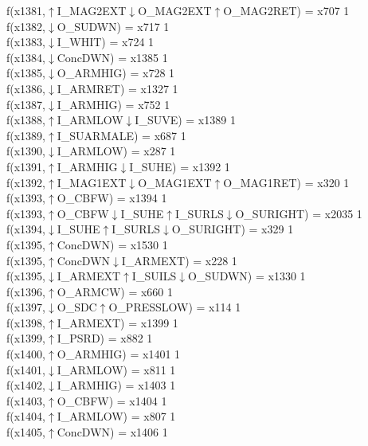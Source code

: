 f(x1381,$\uparrow$I\_MAG2EXT$\downarrow$O\_MAG2EXT$\uparrow$O\_MAG2RET) = x707 {1} \\
f(x1382,$\downarrow$O\_SUDWN) = x717 {1} \\
f(x1383,$\downarrow$I\_WHIT) = x724 {1} \\
f(x1384,$\downarrow$ConcDWN) = x1385 {1} \\
f(x1385,$\downarrow$O\_ARMHIG) = x728 {1} \\
f(x1386,$\downarrow$I\_ARMRET) = x1327 {1} \\
f(x1387,$\downarrow$I\_ARMHIG) = x752 {1} \\
f(x1388,$\uparrow$I\_ARMLOW$\downarrow$I\_SUVE) = x1389 {1} \\
f(x1389,$\uparrow$I\_SUARMALE) = x687 {1} \\
f(x1390,$\downarrow$I\_ARMLOW) = x287 {1} \\
f(x1391,$\uparrow$I\_ARMHIG$\downarrow$I\_SUHE) = x1392 {1} \\
f(x1392,$\uparrow$I\_MAG1EXT$\downarrow$O\_MAG1EXT$\uparrow$O\_MAG1RET) = x320 {1} \\
f(x1393,$\uparrow$O\_CBFW) = x1394 {1} \\
f(x1393,$\uparrow$O\_CBFW$\downarrow$I\_SUHE$\uparrow$I\_SURLS$\downarrow$O\_SURIGHT) = x2035 {1} \\
f(x1394,$\downarrow$I\_SUHE$\uparrow$I\_SURLS$\downarrow$O\_SURIGHT) = x329 {1} \\
f(x1395,$\uparrow$ConcDWN) = x1530 {1} \\
f(x1395,$\uparrow$ConcDWN$\downarrow$I\_ARMEXT) = x228 {1} \\
f(x1395,$\downarrow$I\_ARMEXT$\uparrow$I\_SUILS$\downarrow$O\_SUDWN) = x1330 {1} \\
f(x1396,$\uparrow$O\_ARMCW) = x660 {1} \\
f(x1397,$\downarrow$O\_SDC$\uparrow$O\_PRESSLOW) = x114 {1} \\
f(x1398,$\uparrow$I\_ARMEXT) = x1399 {1} \\
f(x1399,$\uparrow$I\_PSRD) = x882 {1} \\
f(x1400,$\uparrow$O\_ARMHIG) = x1401 {1} \\
f(x1401,$\downarrow$I\_ARMLOW) = x811 {1} \\
f(x1402,$\downarrow$I\_ARMHIG) = x1403 {1} \\
f(x1403,$\uparrow$O\_CBFW) = x1404 {1} \\
f(x1404,$\uparrow$I\_ARMLOW) = x807 {1} \\
f(x1405,$\uparrow$ConcDWN) = x1406 {1} \\
